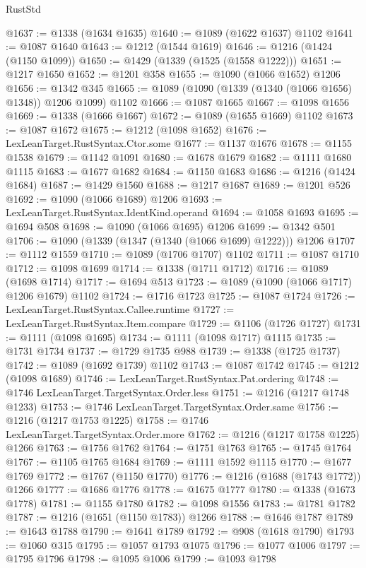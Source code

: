 \begin{lexlean}{RustStd}
\begin{coremodule}
@1637 := @1338 (@1634 @1635)
@1640 := @1089 (@1622 @1637) @1102
@1641 := @1087 @1640
@1643 := @1212 (@1544 @1619)
@1646 := @1216 (@1424 (@1150 @1099))
@1650 := @1429 (@1339 (@1525 (@1558 @1222)))
@1651 := @1217 @1650
@1652 := @1201 @358
@1655 := @1090 (@1066 @1652) @1206
@1656 := @1342 @345
@1665 := @1089 (@1090 (@1339 (@1340 (@1066 @1656) @1348)) @1206 @1099) @1102
@1666 := @1087 @1665
@1667 := @1098 @1656
@1669 := @1338 (@1666 @1667)
@1672 := @1089 (@1655 @1669) @1102
@1673 := @1087 @1672
@1675 := @1212 (@1098 @1652)
@1676 := LexLeanTarget.RustSyntax.Ctor.some
@1677 := @1137 @1676
@1678 := @1155 @1538
@1679 := @1142 @1091
@1680 := @1678 @1679
@1682 := @1111 @1680 @1115
@1683 := @1677 @1682
@1684 := @1150 @1683
@1686 := @1216 (@1424 @1684)
@1687 := @1429 @1560
@1688 := @1217 @1687
@1689 := @1201 @526
@1692 := @1090 (@1066 @1689) @1206
@1693 := LexLeanTarget.RustSyntax.IdentKind.operand
@1694 := @1058 @1693
@1695 := @1694 @508
@1698 := @1090 (@1066 @1695) @1206
@1699 := @1342 @501
@1706 := @1090 (@1339 (@1347 (@1340 (@1066 @1699) @1222))) @1206
@1707 := @1112 @1559
@1710 := @1089 (@1706 @1707) @1102
@1711 := @1087 @1710
@1712 := @1098 @1699
@1714 := @1338 (@1711 @1712)
@1716 := @1089 (@1698 @1714)
@1717 := @1694 @513
@1723 := @1089 (@1090 (@1066 @1717) @1206 @1679) @1102
@1724 := @1716 @1723
@1725 := @1087 @1724
@1726 := LexLeanTarget.RustSyntax.Callee.runtime
@1727 := LexLeanTarget.RustSyntax.Item.compare
@1729 := @1106 (@1726 @1727)
@1731 := @1111 (@1098 @1695)
@1734 := @1111 (@1098 @1717) @1115
@1735 := @1731 @1734
@1737 := @1729 @1735 @988
@1739 := @1338 (@1725 @1737)
@1742 := @1089 (@1692 @1739) @1102
@1743 := @1087 @1742
@1745 := @1212 (@1098 @1689)
@1746 := LexLeanTarget.RustSyntax.Pat.ordering
@1748 := @1746 LexLeanTarget.TargetSyntax.Order.less
@1751 := @1216 (@1217 @1748 @1233)
@1753 := @1746 LexLeanTarget.TargetSyntax.Order.same
@1756 := @1216 (@1217 @1753 @1225)
@1758 := @1746 LexLeanTarget.TargetSyntax.Order.more
@1762 := @1216 (@1217 @1758 @1225) @1266
@1763 := @1756 @1762
@1764 := @1751 @1763
@1765 := @1745 @1764
@1767 := @1105 @1765 @1684
@1769 := @1111 @1592 @1115
@1770 := @1677 @1769
@1772 := @1767 (@1150 @1770)
@1776 := @1216 (@1688 (@1743 @1772)) @1266
@1777 := @1686 @1776
@1778 := @1675 @1777
@1780 := @1338 (@1673 @1778)
@1781 := @1155 @1780
@1782 := @1098 @1556
@1783 := @1781 @1782
@1787 := @1216 (@1651 (@1150 @1783)) @1266
@1788 := @1646 @1787
@1789 := @1643 @1788
@1790 := @1641 @1789
@1792 := @908 (@1618 @1790)
@1793 := @1060 @315
@1795 := @1057 @1793 @1075
@1796 := @1077 @1006
@1797 := @1795 @1796
@1798 := @1095 @1006
@1799 := @1093 @1798

\end{coremodule}
\end{lexlean}
